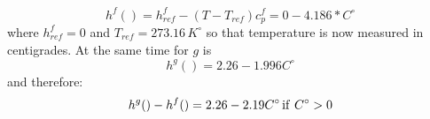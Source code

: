 \begin{equation}
h^f() = h^f_{ref} -(T-T_{ref})c_p^f = 0 - 4.186*  C^\circ   
\end{equation}
where \(h_{ref}^f=0\) and \(T_{ref} = 273.16\, K^\circ\) so that temperature is now measured in centigrades. 
At the same time for \(g\) is 
\begin{equation}
h^g( ) = 2.26  - 1.996 C^\circ
\end{equation}
and therefore:
\begin{equation}
h^g()-h^f() = 2.26 - 2.19 C^\circ \, {\rm if}\ C^\circ > 0
\end{equation}